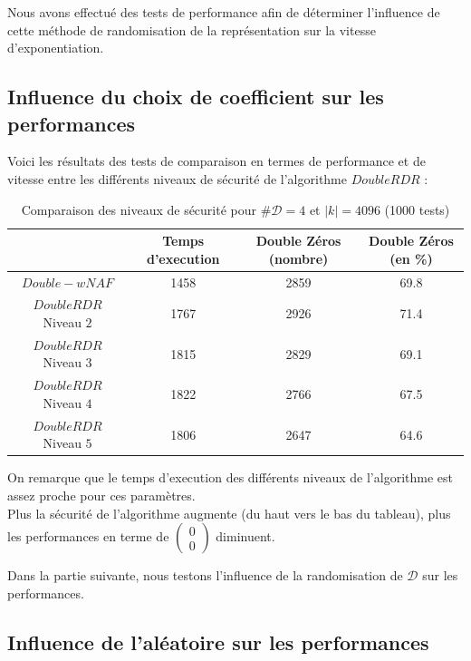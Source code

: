 \documentclass[12pt, a4paper]{memoir}
\newcommand{\doublezero}{\begin{pmatrix} 0 \\ 0 \end{pmatrix}}
\begin{document}
  Nous avons effectué des tests de performance afin de déterminer l'influence de cette méthode de randomisation de la 
  représentation sur la vitesse d'exponentiation.
  
  \subsection{Influence du choix de coefficient sur les performances}

  Voici les résultats des tests de comparaison en termes de performance et de vitesse entre les différents
  niveaux de sécurité de l'algorithme $DoubleRDR$ :
\begin{table}[htbp]
\caption{Comparaison des niveaux de sécurité pour $\#\mathcal{D} = 4$ et $|k| = 4096$ (1000 tests) }
\begin{center}
\begin{tabular}{cccc}
\toprule
\, & Temps d'execution & Double Zéros (nombre) & Double Zéros (en \%) \\
\midrule
$Double-wNAF$ & 1458 & 2859  & 69.8 \\
$DoubleRDR$ Niveau $2$ & 1767 & 2926 & 71.4 \\
$DoubleRDR$ Niveau $3$ & 1815 & 2829 & 69.1 \\
$DoubleRDR$ Niveau $4$ & 1822 & 2766 & 67.5 \\
$DoubleRDR$ Niveau $5$ & 1806 & 2647 & 64.6 \\
\bottomrule
\end{tabular}
\end{center}
\label{tab:example}
\end{table}%

On remarque que le temps d'execution des différents niveaux de l'algorithme est assez proche pour ces paramètres. \\
Plus la sécurité de l'algorithme augmente (du haut vers le bas du tableau), plus les performances en terme
de $\doublezero$ diminuent.

Dans la partie suivante, nous testons l'influence de la randomisation de $\mathcal{D}$ sur les performances.

  \subsection{Influence de l'aléatoire sur les performances}
\end{document}
